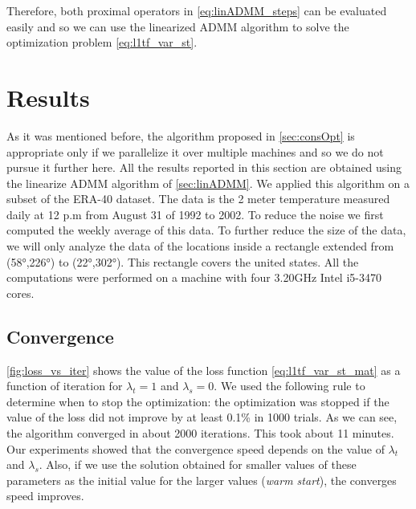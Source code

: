 \documentclass{article}
\begin{document}
Therefore, both proximal operators in \eqref{eq:linADMM_steps} can be evaluated easily and so we can use the linearized ADMM algorithm to solve the optimization problem \eqref{eq:l1tf_var_st}.

\section{Results}
As it was mentioned before, the algorithm proposed in \autoref{sec:consOpt} is appropriate only if we parallelize it over multiple machines and so we do not pursue it further here. All the results reported in this section are obtained using the linearize ADMM algorithm of \autoref{sec:linADMM}. We applied this algorithm on a subset of the ERA-40 dataset. The data is the 2 meter temperature measured daily at 12 p.m from August 31 of 1992 to 2002. To reduce the noise we first computed the weekly average of this data. To further reduce the size of the data, we will only analyze the data of the locations inside a rectangle extended from (\ang{58},\ang{226}) to (\ang{22},\ang{302}). This rectangle covers the united states. All the computations were performed on a machine with four 3.20GHz Intel i5-3470 cores.

\subsection{Convergence}

\autoref{fig:loss_vs_iter} shows the value of the loss function \eqref{eq:l1tf_var_st_mat} as a function of iteration for $\lambda_t=1$ and $\lambda_s=0$. We used the following rule to determine when to stop the optimization: the optimization was stopped if the value of the loss did not improve by at least 0.1\% in 1000 trials. As we can see, the algorithm converged in about 2000 iterations. This took about 11 minutes. Our experiments showed that the convergence speed depends on the value of $\lambda_t$ and $\lambda_s$. Also, if we use the solution obtained for smaller values of these parameters as the initial value for the larger values (\textit{warm start}), the converges speed improves.
\end{document}
